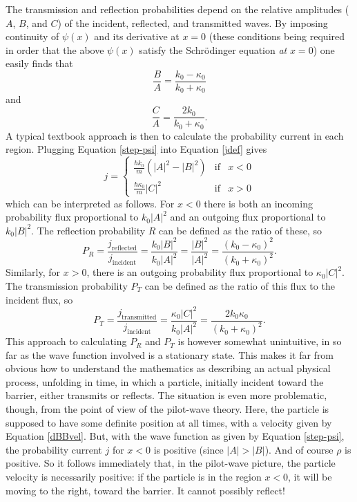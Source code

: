 \documentclass[aps,prc,twocolumn,letterpaper,floatfix]{revtex4}
\begin{document}
The transmission and reflection probabilities depend on the relative
amplitudes ($A$, $B$, and $C$) of the incident, reflected, and
transmitted waves.  By imposing continuity of $\psi(x)$ and its
derivative at $x=0$ (these conditions being required in order that the
above $\psi(x)$ satisfy the Schr\"odinger equation \emph{at} $x=0$)
one easily finds that
\begin{equation}
\frac{B}{A} = \frac{k_0 - \kappa_0}{k_0 + \kappa_0}
\label{BA}
\end{equation}
and
\begin{equation}
\frac{C}{A} = \frac{2k_0}{k_0 + \kappa_0}.
\label{CA}
\end{equation}
A typical textbook approach is then to calculate the probability
current in each region.  Plugging Equation \eqref{step-psi} into
Equation \eqref{jdef} gives
\begin{equation}
j = \left\{
\begin{array}{lcc}
\frac{\hbar k_0}{m} \left( |A|^2 - |B|^2\right) &\text{if} & x<0 \\
\frac{\hbar \kappa_0}{m} |C|^2 & \text{if} & x>0 
\end{array}
\right.
\end{equation}
which can be interpreted as follows.  For $x<0$ there is both an
incoming probability flux proportional to $k_0 |A|^2$ and an outgoing
flux proportional to $k_0 |B|^2$.  The reflection probability $R$ can be
defined as the ratio of these, so
\begin{equation}
P_R = \frac{j_{\text{reflected}}}{j_{\text{incident}}} =
\frac{k_0|B|^2}{k_0|A|^2} = \frac{|B|^2}{|A|^2} = \frac{(k_0-\kappa_0)^2}{(k_0+\kappa_0)^2}.
\label{P_R}
\end{equation}
Similarly, for $x>0$, there is an outgoing probability flux
proportional to $\kappa_0 |C|^2$.  The transmission probability $P_T$ can
be defined as the ratio of this flux to the incident flux, so
\begin{equation}
P_T = \frac{j_{\text{transmitted}}}{j_{\text{incident}}} = \frac{\kappa_0
  |C|^2}{k_0 |A|^2} = \frac{2 k_0 \kappa_0}{(k_0 + \kappa_0)^2}.
\label{P_T}
\end{equation}
This approach to calculating $P_R$ and $P_T$ is however somewhat unintuitive,
in so far as the wave function involved is a stationary state.  This
makes it far from obvious how to understand the mathematics as
describing an actual physical process, unfolding in time, in which a particle, initially
incident toward the barrier, either transmits or reflects.  The
situation is even more problematic, though, from the point of view of
the pilot-wave theory.  Here, the particle is supposed to have some
definite position at all times, with a velocity given by Equation
\eqref{dBBvel}.  But, with the wave function as given by
Equation \eqref{step-psi}, the probability current $j$ for $x<0$ is
positive (since $|A| > |B|$).  And of course $\rho$ is positive.  So it follows
immediately that, in the pilot-wave picture, the particle velocity is
necessarily positive:  if the particle is in the region $x<0$, it will be moving
to the right, toward the barrier.  It cannot possibly reflect!
\end{document}
